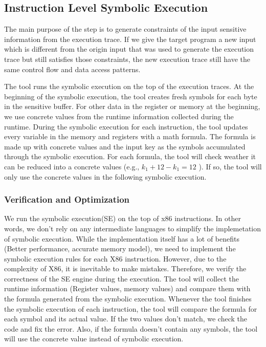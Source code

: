 \subsection{Instruction Level Symbolic Execution}
\label{InstructionSE}
The main purpose of the step is to generate 
constraints of the input sensitive information from the execution trace. 
If we give the target program a new input which 
is different from the origin input that was used 
to generate the execution trace but still satisfies those constraints,
the new execution trace still have the same control flow and 
data access patterns. 

The tool runs the symbolic execution on the top of the execution traces.
At the beginning of the symbolic execution, the tool creates fresh 
symbols for each byte in the sensitive buffer. For other data in the 
register or memory at the beginning, we use concrete values from the 
runtime information collected during the runtime. 
During the symbolic execution for each instruction, 
the tool updates every variable in the memory and registers with a
math formula. The formula is made up with concrete values and 
the input key as the symbols accumulated through the symbolic execution.
For each formula, the tool will check weather it can be reduced
into a concrete values (e.g., $k_1+12-k_1 = 12$ ). 
If so, the tool will only use the concrete values in the 
following symbolic execution.

\subsubsection{Verification and Optimization}
We run the symbolic execution(SE) on the top of x86 instructions.
In other words, we don’t rely on any intermediate languages to 
simplify the implemetation of symbolic execution. 
While the implementation itself 
has a lot of benefits (Better performance, accurate memory model), 
we need to implement the symbolic execution 
rules for each X86 instruction. 
However, due to the complexity of X86, it is inevitable to make mistakes. 
Therefore, we verify the correctness of the SE engine during the execution. 
The tool will collect the runtime information (Register values, 
memory values) and compare them with the formula generated from the 
symbolic execution. Whenever the tool finishes the symbolic execution 
of each instruction, the tool will compare the formula for each symbol 
and its actual value. If the two values don't match, we check the code
and fix the error. Also, if the formula doesn't contain any symbols,
the tool will use the concrete value instead of symbolic execution.


